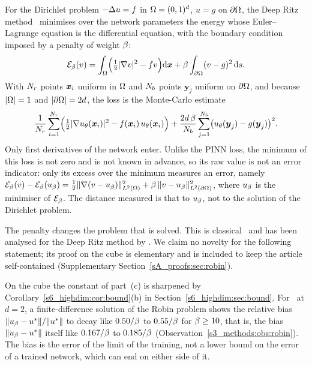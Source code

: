 For the Dirichlet problem $-\Delta u=f$ in $\Omega=(0,1)^d$, $u=g$ on $\partial\Omega$, the Deep Ritz
method~\citep{eyu2018} minimises over the network parameters the energy whose
Euler--Lagrange equation is the differential equation, with the boundary condition
imposed by a penalty of weight $\beta$:
\begin{equation}\label{s3_methods:eq:ritz}
\mathcal{E}_{\beta}(v)=\int_{\Omega}\Bigl(\tfrac12\lvert \nabla v\rvert^2-fv\Bigr)\mathrm{d}\boldsymbol{x}
+\beta\int_{\partial\Omega}(v-g)^2\,\mathrm{d} s .
\end{equation}
With $N_{r}$ points $\boldsymbol{x}_i$ uniform in $\Omega$ and $N_{b}$ points $\boldsymbol{y}_j$ uniform on
$\partial\Omega$, and because $\lvert \Omega\rvert=1$ and $\lvert \partial\Omega\rvert=2d$, the loss is the Monte-Carlo estimate
\begin{equation}\label{s3_methods:eq:ritz-mc}
\frac{1}{N_{r}}\sum_{i=1}^{N_{r}}\Bigl(\tfrac12\lvert \nabla u_{\theta}(\boldsymbol{x}_i)\rvert^2-f(\boldsymbol{x}_i)\,u_{\theta}(\boldsymbol{x}_i)\Bigr)
+\frac{2d\,\beta}{N_{b}}\sum_{j=1}^{N_{b}}\bigl(u_{\theta}(\boldsymbol{y}_j)-g(\boldsymbol{y}_j)\bigr)^2 .
\end{equation}
Only first derivatives of the network enter. Unlike the PINN loss, the minimum of this
loss is not zero and is not known in advance, so its raw value is not an error indicator:
only its excess over the minimum measures an error, namely
$\mathcal{E}_{\beta}(v)-\mathcal{E}_{\beta}(u_{\beta})=\tfrac12\lVert \nabla(v-u_{\beta})\rVert_{L^2(\Omega)}^2+\beta\,\lVert v-u_{\beta}\rVert_{L^2(\partial\Omega)}^2$,
where $u_{\beta}$ is the minimiser of $\mathcal{E}_{\beta}$. The distance measured is that to $u_{\beta}$, not
to the solution of the Dirichlet problem.

The penalty changes the problem that is solved. This is classical~\citep{babuska1973} and
has been analysed for the Deep Ritz method by \citet{muller2022}. We claim no novelty for
the following statement; its proof on the cube is elementary and is included to keep the
article self-contained (Supplementary Section~\ref{sA_proofs:sec:robin}).

\begin{proposition}%
\label{s3_methods:prop:robin}
\StmtRobin
\end{proposition}

\noindent On the cube the constant of part~(c) is sharpened by
Corollary~\ref{s6_highdim:cor:bound}(b) in Section~\ref{s6_highdim:sec:bound}.
For \Pone\ at $d=2$, a finite-difference solution of the Robin problem shows the relative bias
$\lVert u_{\beta}-u^{*}\rVert/\lVert u^{*}\rVert$ to decay like $0.50/\beta$ to $0.55/\beta$ for $\beta\ge10$,
that is, the bias $\lVert u_{\beta}-u^{*}\rVert$ itself like $0.167/\beta$ to $0.185/\beta$
(Observation~\ref{s3_methods:obs:robin}). The bias
is the error of the limit of the training, not a lower bound on the error of a trained
network, which can end on either side of it.

